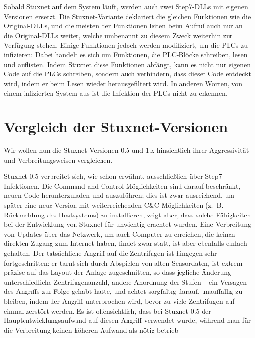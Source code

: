 \documentclass[a4paper]{article}
\begin{document}
Sobald Stuxnet auf dem System läuft, werden auch zwei Step7-DLLs mit eigenen Versionen ersetzt.
Die Stuxnet-Variante deklariert die gleichen Funktionen wie die Original-DLLs,
und die meisten der Funktionen leiten beim Aufruf auch nur an die Original-DLLs weiter,
welche umbenannt zu diesem Zweck weiterhin zur Verfügung stehen.
Einige Funktionen jedoch werden modifiziert, um die PLCs zu infizieren:
Dabei handelt es sich um Funktionen, die PLC-Blöcke schreiben, lesen und auflisten.
Indem Stuxnet diese Funktionen abfängt, kann es nicht nur eigenen Code auf die PLCs schreiben,
sondern auch verhindern, dass dieser Code entdeckt wird, indem er beim Lesen wieder herausgefiltert wird.
In anderen Worten, von einem infizierten System aus ist die Infektion der PLCs nicht zu erkennen.


\section{Vergleich der Stuxnet-Versionen}

Wir wollen nun die Stuxnet-Versionen 0.5 und 1.x hinsichtlich ihrer Aggressivität und Verbreitungsweisen vergleichen.

Stuxnet 0.5 verbreitet sich, wie schon erwähnt, ausschließlich über Step7-Infektionen.
Die Command-and-Control-Möglichkeiten sind darauf beschränkt, neuen Code herunterzuladen und auszuführen;
dies ist zwar ausreichend, um später eine neue Version mit weiterreichenden C\&C-Möglichkeiten (z.~B. Rück\-mel\-dung des Hostsystems) zu installieren,
zeigt aber, dass solche Fähigkeiten bei der Entwicklung von Stuxnet für unwichtig erachtet wurden.
Eine Verbreitung von Updates über das Netzwerk, um auch Computer zu erreichen, die keinen direkten Zugang zum Internet haben,
findet zwar statt, ist aber ebenfalls einfach gehalten.
Der tatsächliche Angriff auf die Zentrifugen ist hingegen sehr fortgeschritten:
er tarnt sich durch Abspielen von alten Sensordaten,
ist extrem präzise auf das Layout der Anlage zugeschnitten, so dass jegliche Änderung – unterschiedliche Zentrifugenanzahl, andere Anordnung der Stufen – ein Versagen des Angriffs zur Folge gehabt hätte,
und achtet sorgfältig darauf, unauffällig zu bleiben, indem der Angriff unterbrochen wird, bevor zu viele Zentrifugen auf einmal zerstört werden.
Es ist offensichtlich, dass bei Stuxnet 0.5 der Hauptentwicklungsaufwand auf diesen Angriff verwendet wurde,
während man für die Verbreitung keinen höheren Aufwand als nötig betrieb.
\end{document}
